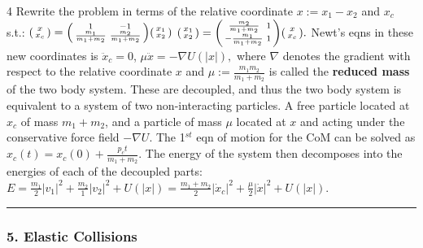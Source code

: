 \documentclass[landscape, 8pt]{extarticle}
\begin{document}
\begin{multicols*}{4}
		Rewrite the problem in terms of the relative coordinate $x:=x_1-x_2$ and $x_c$ s.t.:
		$
		\begin{psmallmatrix*}x\\x_c\end{psmallmatrix*}=\begin{psmallmatrix*}1 & -1\\ \frac{m_1}{m_1+m_2} & \frac{m_2}{m_1+m_2}\end{psmallmatrix*}\begin{psmallmatrix*}x_1\\x_2\end{psmallmatrix*}
		$
		$
		\begin{psmallmatrix*}x_1\\x_2\end{psmallmatrix*}=\begin{psmallmatrix*}\frac{m_2}{m_1+m_2} & 1\\ -\frac{m_1}{m_1+m_2} & 1\end{psmallmatrix*}\begin{psmallmatrix*}x\\x_c\end{psmallmatrix*}.
		$
		Newt's eqns in these new coordinates is $\ddot{x}_c=0$,
		$
		\mu\ddot{x}=-\nabla U(|x|),
		$
		where $\nabla$ denotes the gradient with respect to the relative coordinate $x$ and $\mu:=\frac{m_1 m_2}{m_1+m_2}$ is called the \textbf{reduced mass} of the two body system. These are decoupled, and thus the two body system is equivalent to a system of two non-interacting particles. A free particle located at $x_c$ of mass $m_1+m_2$, and a particle of mass $\mu$ located at $x$ and acting under the conservative force field $-\nabla U$. The 1$^{st}$ eqn of motion for the CoM can be solved as
		$
		x_c(t)=x_c(0)+\frac{p_ct}{m_1+m_2}.
		$
		The energy of the system then decomposes into the energies of each of the decoupled parts:
		$
		E=\frac{m_1}{2}|v_1|^2+\frac{m_2}{1}|v_2|^2+U(|x|)
		=\frac{m_1+m_2}{2}|\dot{x}_c|^2+\frac{\mu}{2}|\dot{x}|^2+U(|x|).
		$
		\vspace{1pt}
		\hrule
		\vspace*{-3pt}
		\subsubsection*{\tiny{5. Elastic Collisions}}
		\vspace*{-5pt}
		

\end{multicols*}
\end{document}
